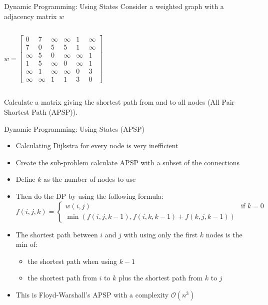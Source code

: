 \documentclass[11pt,pdf, aspectratio=169]{beamer}
\begin{document}
  \begin{frame}{Dynamic Programming: Using States}
    Consider a weighted graph with a adjacency matrix $w$
    \begin{columns}
      \[ w = \begin{bmatrix}
               0      & 7      & \infty & \infty & 1      & \infty \\
               7      & 0      & 5      & 5      & 1      & \infty \\
               \infty & 5      & 0      & \infty & \infty & 1      \\
               1      & 5      & \infty & 0      & \infty & 1      \\
               \infty & 1      & \infty & \infty & 0      & 3      \\
               \infty & \infty & 1      & 1      & 3      & 0
      \end{bmatrix}\]
    \end{columns}
    Calculate a matrix giving the shortest path from and to all nodes (All Pair Shortest Path (APSP)).
  \end{frame}
  \begin{frame}{Dynamic Programming: Using States (APSP) }
    \begin{itemize}
      \item Calculating Dijkstra for every node is very inefficient
      \item Create the sub-problem calculate APSP with a subset of the connections
      \item Define $k$ as the number of nodes to use
      \item Then do the DP by using the following formula:\\
      \[
        f(i, j, k) = \begin{cases}
                       w(i, j)  & \text{if } k = 0\\
                       \min(f(i,j, k-1), f(i, k, k-1)+f(k, j, k-1))
        \end{cases}
      \]
      \item The shortest path between $i$ and $j$ with using only the first $k$ nodes is the min of:
      \begin{itemize}
        \item the shortest path when using $k-1$
        \item the shortest path from $i$ to $k$ plus the shortest path from $k$ to $j$
      \end{itemize}
      \item This is Floyd-Warshall's APSP with a complexity $\mathcal{O}(n^3)$
    \end{itemize}
  \end{frame}
\end{document}
